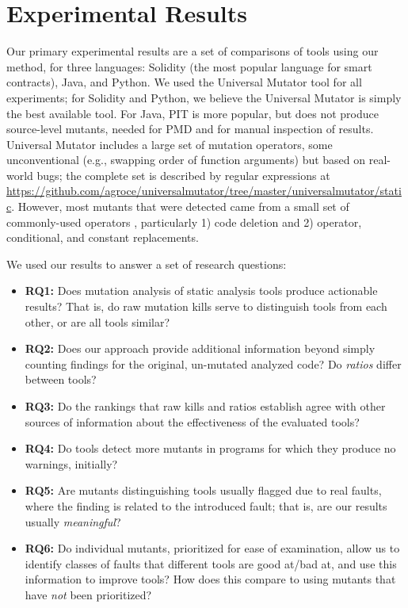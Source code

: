 \section{Experimental Results}

Our primary experimental results are a set of comparisons of tools using our method, for three languages: Solidity (the most popular language for smart contracts), Java, and Python.  We used the Universal Mutator tool for all experiments; for Solidity and Python, we believe the Universal Mutator is simply the best available tool.  For Java, PIT \cite{pitmut} is more popular, but does not produce source-level mutants, needed for PMD and for manual inspection of results.   Universal Mutator includes a large set of mutation operators, some unconventional (e.g., swapping order of function arguments) but based on real-world bugs; the complete set is described by regular expressions at \url{https://github.com/agroce/universalmutator/tree/master/universalmutator/static}.  However, most mutants that were detected came from a small set of  commonly-used operators \cite{mutant}, particularly 1) code deletion and 2) operator, conditional, and constant replacements.

We used our results to answer a set of research questions:

\begin{itemize}[labelsep=3pt,leftmargin=12pt]
\item {\bf RQ1:}  Does mutation analysis of static analysis tools produce actionable results?  That is, do raw mutation kills serve to distinguish tools from each other, or are all tools similar?
\item {\bf RQ2:}  Does our approach provide additional information beyond simply counting findings for the original, un-mutated analyzed code?  Do \emph{ratios} differ between tools?
\item {\bf RQ3:}  Do the rankings that raw kills and ratios establish agree with other sources of information about the effectiveness of the evaluated tools? 
\item {\bf RQ4:}  Do tools detect more mutants in programs for which they produce no warnings, initially?
\item {\bf RQ5:}  Are mutants distinguishing tools usually flagged due to real faults, where the finding is related to the introduced fault; that is, are our results usually \emph{meaningful}?
\item {\bf RQ6:}  Do individual mutants, prioritized for ease of examination, allow us to identify classes of faults that
  different tools are good at/bad at, and use this information to improve tools?  How does this compare to using mutants that have \emph{not} been prioritized?
  \end{itemize}

